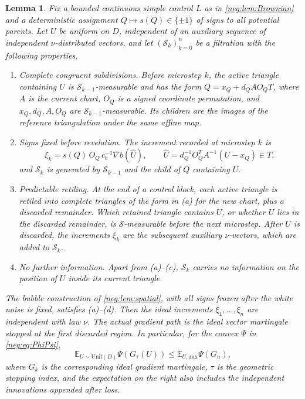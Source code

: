 \documentclass[11pt]{article}
\newtheorem{lemma}[lemma]{Lemma}
\theoremstyle{definition}
\theoremstyle{remark}
\numberwithin{equation}{section}
\begin{document}
\begin{lemma}
\label{neg:lem:branch}
Fix a bounded continuous simple control $L$ as in
\cref{neg:lem:Brownian} and a deterministic assignment
$Q\mapsto s(Q)\in\{\pm1\}$ of signs to all potential parents.
Let $U$ be uniform on $D$, independent of an auxiliary sequence of
independent $\nu$-distributed vectors, and let
$(\mathcal S_k)_{k=0}^n$ be a filtration with the following properties.
\begin{enumerate}[label=(\alph*),leftmargin=2.5em]
\item \emph{Complete congruent subdivisions.} Before microstep $k$,
  the active triangle containing $U$ is $\mathcal S_{k-1}$-measurable
  and has the form $Q=x_Q+d_QAO_QT$, where $A$ is the current chart,
  $O_Q$ is a signed coordinate permutation, and $x_Q,d_Q,A,O_Q$ are
  $\mathcal S_{k-1}$-measurable. Its children are the images of the
  reference triangulation under the same affine map.
\item \emph{Signs fixed before revelation.} The increment recorded at
  microstep $k$ is
  \[
   \xi_k=s(Q)\,O_Q\,c_b^{-1}\nabla b(\widehat U),
   \qquad \widehat U=d_Q^{-1}O_Q^TA^{-1}(U-x_Q)\in T,
  \]
  and
  $\mathcal S_k$ is generated by $\mathcal S_{k-1}$ and the child of
  $Q$ containing $U$.
\item \emph{Predictable retiling.} At the end of a control block, each
  active triangle is retiled into complete triangles of the form in
  (a) for the new chart, plus a discarded remainder. Which retained
  triangle contains $U$, or whether $U$ lies in the discarded
  remainder, is $\mathcal S$-measurable before the next microstep.
  After $U$ is discarded, the increments $\xi_k$ are the subsequent
  auxiliary $\nu$-vectors, which are added to $\mathcal S_k$.
\item \emph{No further information.} Apart from (a)--(c),
  $\mathcal S_k$ carries no information on the position of $U$
  inside its current triangle.
\end{enumerate}
The bubble construction of \cref{neg:lem:spatial}, with all signs
frozen after the white noise is fixed, satisfies (a)--(d).
Then the ideal increments $\xi_1,\dots,\xi_n$
are independent with law $\nu$. The actual gradient path is the
ideal vector martingale stopped at the first discarded region. In
particular, for the convex $\Psi$ in \eqref{neg:eq:PhiPsi},
\begin{equation}\label{neg:eq:stopped-Jensen}
 \mathbb E_{U\sim\mathrm{Unif}(D)}
      \Psi(G_{\tau}(U))
 \le\mathbb E_{U,\mathrm{aux}}\Psi(G_n),
\end{equation}
where $G_k$ is the corresponding ideal gradient martingale,
$\tau$ is the geometric stopping index, and the expectation on
the right also includes the independent innovations appended after
loss.
\end{lemma}
\end{document}
